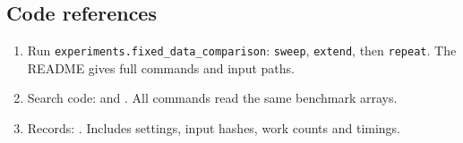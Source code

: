 \subsection{Code references}
\begin{enumerate}
\item Run \texttt{experiments.fixed\_data\_comparison}: \texttt{sweep}, \texttt{extend}, then \texttt{repeat}. The README gives full commands and input paths.
\item Search code:  and . All commands read the same benchmark arrays.
\item Records: . Includes settings, input hashes, work counts and timings.
\end{enumerate}
